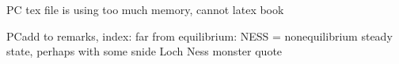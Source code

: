 {PC{ tex file is using too much memory, cannot
latex book}

PC{add to remarks, index: far from equilibrium:
    NESS = nonequilibrium steady
    state, perhaps with some snide Loch Ness monster quote}

%
%
%
%
%
%
}
